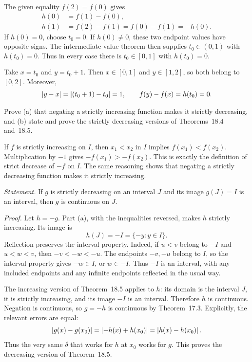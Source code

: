 The given equality $f(2)=f(0)$ gives
\[
 \begin{aligned}
 h(0)&=f(1)-f(0),\\
 h(1)&=f(2)-f(1)=f(0)-f(1)=-h(0).
 \end{aligned}
\]
If $h(0)=0$, choose $t_0=0$. If $h(0)\ne0$, these two
endpoint values have opposite signs. The intermediate value
theorem then supplies $t_0\in(0,1)$ with $h(t_0)=0$.
Thus in every case there is $t_0\in[0,1]$ with $h(t_0)=0$.

Take $x=t_0$ and $y=t_0+1$. Then $x\in[0,1]$ and
$y\in[1,2]$, so both belong to $[0,2]$. Moreover,
\[
 \left|y-x\right|=\left|(t_0+1)-t_0\right|=1,
 \qquad f(y)-f(x)=h(t_0)=0.
\]

\goal Prove (a) that negating a strictly increasing function
makes it strictly decreasing, and (b) state and prove the
strictly decreasing versions of Theorems~18.4 and~18.5.

If $f$ is strictly increasing on $I$, then $x_1<x_2$ in $I$
implies $f(x_1)<f(x_2)$. Multiplication by $-1$ gives
$-f(x_1)>-f(x_2)$. This is exactly the definition of strict
decrease of $-f$ on $I$.
The same reasoning shows that negating a strictly decreasing
function makes it strictly increasing.

\emph{Statement.} If $g$ is strictly decreasing on an interval
$J$ and its image $g(J)=I$ is an interval, then $g$ is
continuous on $J$.

\emph{Proof.} Let $h=-g$. Part (a), with the inequalities
reversed, makes $h$ strictly increasing. Its image is
\[
 h(J)=-I=\{-y:y\in I\}.
\]
Reflection preserves the interval property. Indeed, if
$u<v$ belong to $-I$ and $u<w<v$, then
$-v<-w<-u$. The endpoints $-v,-u$ belong to $I$, so the
interval property gives $-w\in I$, or $w\in-I$.
Thus $-I$ is an interval, with any included endpoints and
any infinite endpoints reflected in the usual way.

The increasing version of Theorem~18.5 applies to $h$:
its domain is the interval $J$, it is strictly increasing,
and its image $-I$ is an interval. Therefore $h$ is continuous.
Negation is continuous, so $g=-h$ is continuous by Theorem~17.3.
Explicitly, the relevant errors are equal:
\[
 \left|g(x)-g(x_0)\right|
 =\left|-h(x)+h(x_0)\right|
 =\left|h(x)-h(x_0)\right|.
\]
Thus the very same $\delta$ that works for $h$ at $x_0$ works
for $g$. This proves the decreasing version of Theorem~18.5.

